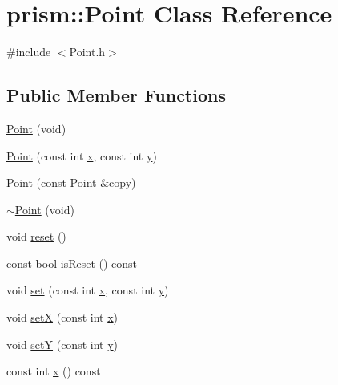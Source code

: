 \hypertarget{classprism_1_1_point}{}\section{prism\+:\+:Point Class Reference}
\label{classprism_1_1_point}


{\ttfamily \#include $<$Point.\+h$>$}

\subsection*{Public Member Functions}
\begin{DoxyCompactItemize}
\item 
\hyperlink{classprism_1_1_point_a505a19bd681a9e195f8bf9dbd3c445c7}{Point} (void)
\item 
\hyperlink{classprism_1_1_point_a93bfdd8fa48253786030802190577129}{Point} (const int \hyperlink{classprism_1_1_point_a725d8721ccf4e59ce9a912490e9487f9}{x}, const int \hyperlink{classprism_1_1_point_ac3283efaa56d37b9d69b7ff5e9d5c2f4}{y})
\item 
\hyperlink{classprism_1_1_point_af09a25c46be47b8c4566b15ddac632b0}{Point} (const \hyperlink{classprism_1_1_point}{Point} \&\hyperlink{namespaceprism_ae776f4cd825f79e7af1cf6ee1d90a209}{copy})
\item 
\hyperlink{classprism_1_1_point_a948aa05b80053c019bf963315a2cea8a}{$\sim$\+Point} (void)
\item 
void \hyperlink{classprism_1_1_point_abda32c4f2e16a5a3276949732992f911}{reset} ()
\item 
const bool \hyperlink{classprism_1_1_point_a426d00c2d9d582723ed69e1a73034641}{is\+Reset} () const 
\item 
void \hyperlink{classprism_1_1_point_ac327d98f8dfc1768a6aae63a144cf2fd}{set} (const int \hyperlink{classprism_1_1_point_a725d8721ccf4e59ce9a912490e9487f9}{x}, const int \hyperlink{classprism_1_1_point_ac3283efaa56d37b9d69b7ff5e9d5c2f4}{y})
\item 
void \hyperlink{classprism_1_1_point_a39aac064dac78373b3be254ab2bc6ab4}{setX} (const int \hyperlink{classprism_1_1_point_a725d8721ccf4e59ce9a912490e9487f9}{x})
\item 
void \hyperlink{classprism_1_1_point_afc2fc43295a911175d7e709b80dc2068}{setY} (const int \hyperlink{classprism_1_1_point_ac3283efaa56d37b9d69b7ff5e9d5c2f4}{y})
\item 
const int \hyperlink{classprism_1_1_point_a725d8721ccf4e59ce9a912490e9487f9}{x} () const 
\item 

\end{DoxyCompactItemize}
